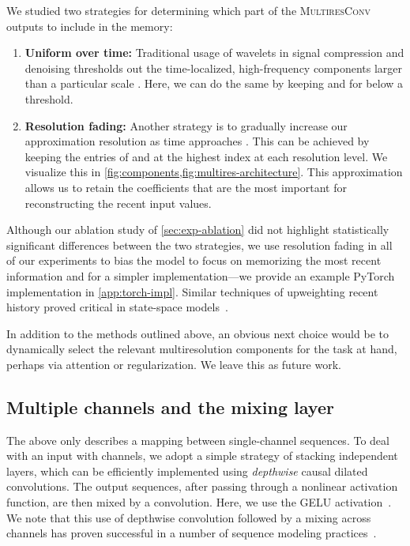 \documentclass{article}
\theoremstyle{plain}
\theoremstyle{definition}
\theoremstyle{remark}
\begin{document}
We studied two strategies for determining which part of the \textsc{MultiresConv} outputs to include in the memory:
\begin{enumerate}[(1)]
    \item \textbf{Uniform over time:} Traditional usage of wavelets in signal compression and denoising thresholds out the time-localized, high-frequency components larger than a particular scale . 
    Here, we can do the same by keeping  and  for  below a threshold. 
    \item \textbf{Resolution fading:} Another strategy is to gradually increase our approximation resolution as time approaches . 
    This can be achieved by keeping the entries of  and  at the highest index at each resolution level. We visualize this in \cref{fig:components,fig:multires-architecture}.
    This approximation allows us to retain the coefficients that are the most important for reconstructing the recent input values.
\end{enumerate}
Although our ablation study of \cref{sec:exp-ablation} did not highlight statistically significant differences between the two strategies, 
we use resolution fading in all of our experiments to bias the model to focus on memorizing the most recent information and for a simpler implementation---we provide an example PyTorch implementation in \cref{app:torch-impl}.
Similar techniques of upweighting recent history proved critical in state-space models~\citep{gu2020hippo,gu2021efficiently}.

In addition to the methods outlined above, an obvious next choice would be to dynamically select the relevant multiresolution components for the task at hand, perhaps via attention or  regularization.  We leave this as future work.

\subsection{Multiple channels and the mixing layer}

The above only describes a mapping between single-channel sequences. 
To deal with an input  with  channels, we adopt a simple strategy of stacking  independent layers, which can be efficiently implemented using \emph{depthwise} causal dilated convolutions. 
The  output sequences, after passing through a nonlinear activation function, 
are then mixed by a  convolution. 
Here, we use the GELU activation~\citep{hendrycks2016gaussian}.
We note that this use of depthwise convolution followed by a mixing across channels has proven successful in a number of sequence modeling practices~\citep{wu2018pay,gu2021efficiently}.  
\end{document}
